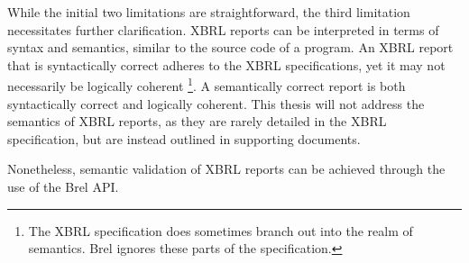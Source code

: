 While the initial two limitations are straightforward, the third limitation necessitates further clarification.
XBRL reports can be interpreted in terms of syntax and semantics, similar to the source code of a program.
An XBRL report that is syntactically correct adheres to the XBRL specifications, yet it may not necessarily be logically coherent
\footnote{The XBRL specification does sometimes branch out into the realm of semantics. Brel ignores these parts of the specification.}.
A semantically correct report is both syntactically correct and logically coherent.
This thesis will not address the semantics of XBRL reports, 
as they are rarely detailed in the XBRL specification,
but are instead outlined in supporting documents.

Nonetheless, semantic validation of XBRL reports can be achieved through the use of the Brel API.

